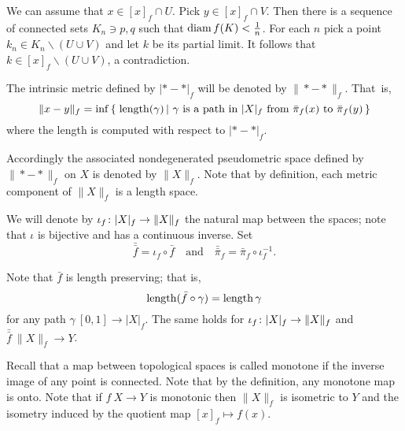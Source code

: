 \documentclass{article}
\begin{document}
We can assume that $x\in [x]_f\cap U$.
Pick $y\in [x]_f\cap V$.
Then there is a sequence of connected sets $K_n\ni p,q$ such that $\mathop{\rm diam}\nolimits f(K)<\tfrac1n$.
For each $n$ pick a point $k_n\in K_n\backslash (U\cup V)$ and let $k$ be its partial limit.
It follows that $k\in [x]_f\backslash (U\cup V)$, a contradiction.
\qeds

The intrinsic metric defined by $|{*}-{*}|_f$ will be denoted by 
$\|{*}-{*}\|_f$. 
That~is, 
\[\|x-y\|_f
=
\inf
\set{\length(\gamma)}{\gamma\ \text{is a path in}\ |X|_f\ \text{from}\ \bar\pi_f(x) \ \text{to}\ \bar\pi_f(y)}\]
where the length is computed with respect to $|{*}-{*}|_f$. 

Accordingly the associated nondegenerated  pseudometric space defined by $\|{*}-{*}\|_f$ on $X$ 
is denoted by $\|X\|_f$. 
Note that by definition, each metric component of $\|X\|_f$ is a length space.

\begin{wrapfigure}{r}{33 mm}
\end{wrapfigure}

We will denote by $\iota_f\:|X|_f\zz\to \|X\|_f$ the natural map between the spaces;
note that $\iota$ is bijective and has a continuous inverse.
Set 
\[
\bar{\bar f}=\iota_f\circ\bar f
\quad\text{and}\quad
\bar{\bar\pi}_f=\bar\pi_f\circ\iota_f^{-1}.
\]


Note that  $\bar f$
is length preserving;
that is,
\[\mathop{\rm length}\nolimits(\bar f\circ\gamma)=\mathop{\rm length}\nolimits\gamma\]
for any path $\gamma\:[0,1]\to |X|_f$.
The same holds for  $\iota_f\:|X|_f\zz\to \|X\|_f$ and $\bar{\bar f}\:\|X\|_f\to Y$.

Recall that a map between topological spaces is called monotone if the inverse image of any point is connected.
Note that by the definition, any monotone map is onto.
Note that if $f\:X\to Y$ is monotonic then $\|X\|_f$ is isometric to $Y$
and the isometry induced by the quotient map $[x]_f\mapsto f(x)$.
\end{document}
